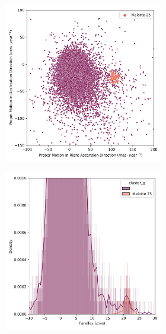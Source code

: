 \documentclass[11pt, a4paper, english]{book}
\begin{document}
\begin{figure}[H]
  \vfil
  \centering
  \begin{subfigure}{0.9\textwidth}
    \centering
    \begin{subfigure}[t]{0.30\textwidth}
      \centering
      \includegraphics[width=\textwidth]{../figures/melotte_25/pm_melotte_25.png}
    \end{subfigure}
    \hfill
    \begin{subfigure}[t]{0.30\textwidth}
      \centering
      \includegraphics[width=\textwidth]{../figures/melotte_25/parallax_melotte_25.png}

\end{subfigure}
\end{subfigure}
\end{figure}
\end{document}
